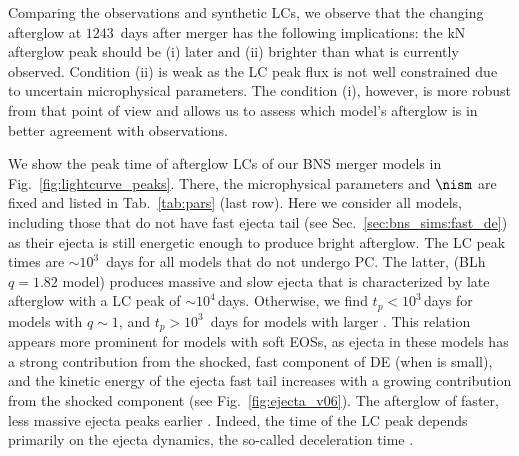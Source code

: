 
Comparing the \GRB{} observations and synthetic \acp{LC}, we observe that the 
changing afterglow at $1243$~days after merger has the following implications:
the \ac{kN} afterglow peak should be (i) later and (ii) brighter than what is
currently observed. 
%
Condition (ii) is weak as the \ac{LC} peak flux is not well constrained due to 
uncertain microphysical parameters.
The condition (i), however, is more robust from that point of view and 
allows us to assess which model's afterglow is in better agreement with observations.

We show the peak time of afterglow \acp{LC} of our \ac{BNS} merger models in 
Fig.~\ref{fig:lightcurve_peaks}. There, the microphysical parameters and $\nism$ are fixed 
and listed in Tab.~\ref{tab:pars} (last row). 
Here we consider all models, including those that do not have fast ejecta tail 
(see Sec.~\ref{sec:bns_sims:fast_de}) as their ejecta is still energetic enough 
to produce bright afterglow. 
%
The \ac{LC} peak times are ${\sim}10^3$~days for all models that do not undergo \ac{PC}. 
The latter, (BLh $q=1.82$ model) produces massive and 
slow ejecta that is characterized by late afterglow 
with a \ac{LC} peak of ${\sim}10^4\,$days.
%
Otherwise, we find $t_{p}<10^3\,$days for models with $q\sim1$, and 
$t_p>10^3$~days for models with larger \mr{}. 
%
This relation appears more prominent for 
models with soft \acp{EOS}, as ejecta in these models has a strong contribution from the
shocked, fast component of \ac{DE} (when \mr{} is small), and the 
kinetic energy of the ejecta fast tail increases with 
a growing contribution from the shocked component (see Fig.~\ref{fig:ejecta_v06}). 
The afterglow of faster, less massive ejecta peaks earlier 
\citep[\eg][]{Hotokezaka:2015eja}.
Indeed, the time of the \ac{LC} peak depends primarily on the ejecta 
dynamics, the so-called deceleration time \citep[\eg][]{Piran:2012wd}.

